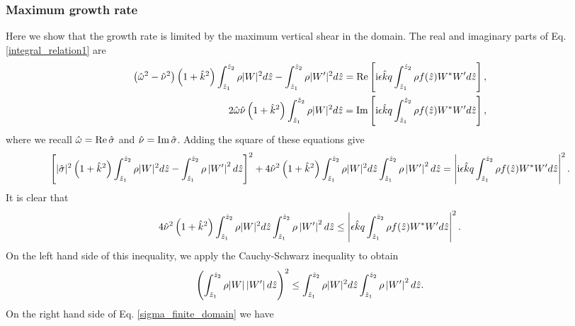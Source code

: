 \subsubsection{Maximum growth rate}\label{max_growth1}
Here we show that the growth rate is limited by the maximum vertical
shear in the domain. %
The real and imaginary parts of 
Eq. \ref{integral_relation1} are
\begin{align}
  \left(\hat{\omega}^2-\hat{\nu}^2\right)\left(1+\hat{k}^2\right)
  \int_{\hat{z}_1}^{\hat{z}_2}\rho|W|^2d\hat{z} -
  \int_{\hat{z}_1}^{\hat{z}_2}\rho|W^\prime|^2d\hat{z}
  \notag
  =\operatorname{Re}\left[\mathrm{i}
    \epsilon\hat{k}q \int_{\hat{z}_1}^{\hat{z}_2}\rho
    f(\hat{z}) W^*W^\prime d\hat{z}\right], \\
   2\hat{\omega}\hat{\nu}\left(1+\hat{k}^2\right)
  \int_{\hat{z}_1}^{\hat{z}_2}\rho|W|^2d\hat{z}
  =\operatorname{Im}\left[\mathrm{i}
    \epsilon\hat{k}q \int_{\hat{z}_1}^{\hat{z}_2}\rho
    f(\hat{z}) W^*W^\prime d\hat{z}\right],
\end{align}
where we recall $\hat{\omega} = \operatorname{Re} \hat{\sigma}$ and
$\hat{\nu}=\operatorname{Im}\hat{\sigma}$. 
Adding the square of these equations give
\begin{align}
  \left[|\hat{\sigma}|^2\left(1+\hat{k}^2\right)
    \int_{\hat{z}_1}^{\hat{z}_2}\rho|W|^2d\hat{z} -
    \int_{\hat{z}_1}^{\hat{z}_2}\rho\left|W^\prime \right|^2d\hat{z}\right]^2
  +4\hat{\nu}^2\left(1+\hat{k}^2\right) 
  \int_{\hat{z}_1}^{\hat{z}_2}\rho
  |W|^2d\hat{z}\int_{\hat{z}_1}^{\hat{z}_2}\rho\left|W^\prime \right|^2d\hat{z}
  =\left|\mathrm{i}
    \epsilon\hat{k}q\int_{\hat{z}_1}^{\hat{z}_2}\rho
    f(\hat{z}) W^*W^\prime d\hat{z}\right|^2.
\end{align}
It is clear that
\begin{align}\label{sigma_finite_domain} 
  4\hat{\nu}^2\left(1+\hat{k}^2\right) 
  \int_{\hat{z}_1}^{\hat{z}_2}\rho
  |W|^2d\hat{z}\int_{\hat{z}_1}^{\hat{z}_2}\rho\left|W^\prime
  \right|^2d\hat{z} 
  \leq\left|
    \epsilon\hat{k}q\int_{\hat{z}_1}^{\hat{z}_2}\rho
    f(\hat{z}) W^*W^\prime d\hat{z}\right|^2.
\end{align}
On the left hand side of this inequality, we apply the Cauchy-Schwarz
inequality to obtain
\begin{align}
  \left( \int_{\hat{z}_1}^{\hat{z}_2}\rho
    |W|\left|W^\prime \right|d\hat{z}\right)^2\leq
  \int_{\hat{z}_1}^{\hat{z}_2}\rho 
  |W|^2d\hat{z}\int_{\hat{z}_1}^{\hat{z}_2}\rho\left|W^\prime \right|^2d\hat{z}.
\end{align}
On the right hand side of Eq. \ref{sigma_finite_domain} we have
